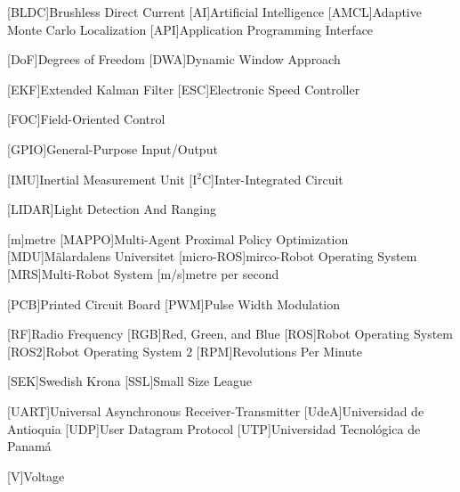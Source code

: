 
[BLDC]{Brushless Direct Current}
[AI]{Artificial Intelligence}
[AMCL]{Adaptive Monte Carlo Localization}
[API]{Application Programming Interface}

[DoF]{Degrees of Freedom}
[DWA]{Dynamic Window Approach}

[EKF]{Extended Kalman Filter}
[ESC]{Electronic Speed Controller}

[FOC]{Field-Oriented Control}

[GPIO]{General-Purpose Input/Output}

[IMU]{Inertial Measurement Unit}
[I$^2$C]{Inter-Integrated Circuit}

[LIDAR]{Light Detection And Ranging}

[m]{metre}
[MAPPO]{Multi-Agent Proximal Policy Optimization}
[MDU]{Mälardalens Universitet}
[micro-ROS]{mirco-Robot Operating System}
[MRS]{Multi-Robot System}
[m/s]{metre per second}

[PCB]{Printed Circuit Board}
[PWM]{Pulse Width Modulation}

[RF]{Radio Frequency}
[RGB]{Red, Green, and Blue}
[ROS]{Robot Operating System}
[ROS2]{Robot Operating System 2}
[RPM]{Revolutions Per Minute}

[SEK]{Swedish Krona}
[SSL]{Small Size League}

[UART]{Universal Asynchronous Receiver-Transmitter}
[UdeA]{Universidad de Antioquia}
[UDP]{User Datagram Protocol}
[UTP]{Universidad Tecnológica de Panamá}

[V]{Voltage}

